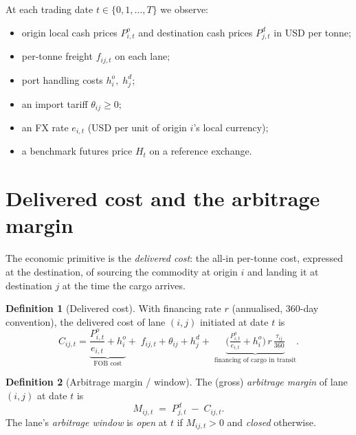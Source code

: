 \documentclass[11pt]{article}
\theoremstyle{definition}
\newtheorem{definition}{Definition}
\theoremstyle{plain}
\begin{document}
At each trading date $t\in\{0,1,\dots,T\}$ we observe:
\begin{itemize}[topsep=2pt,itemsep=1pt]
  \item origin local cash prices $P^{o}_{i,t}$ and destination cash prices
        $P^{d}_{j,t}$ in USD per tonne;
  \item per-tonne freight $f_{ij,t}$ on each lane;
  \item port handling costs $h_i^o,\;h_j^d$;
  \item an import tariff $\theta_{ij}\ge 0$;
  \item an FX rate $e_{i,t}$ (USD per unit of origin $i$'s local currency);
  \item a benchmark futures price $H_t$ on a reference exchange.
\end{itemize}

\section{Delivered cost and the arbitrage margin}
\label{sec:delivered}

The economic primitive is the \emph{delivered cost}: the all-in per-tonne cost,
expressed at the destination, of sourcing the commodity at origin $i$ and
landing it at destination $j$ at the time the cargo arrives.

\begin{definition}[Delivered cost]
\label{def:delivered}
With financing rate $r$ (annualised, $360$-day convention), the delivered cost
of lane $(i,j)$ initiated at date $t$ is
\begin{equation}
C_{ij,t}
=\underbrace{\frac{P^{o}_{i,t}}{e_{i,t}}+h^o_i}_{\text{FOB cost}}
+\;f_{ij,t}+\theta_{ij}+h^d_j
+\;\underbrace{\Big(\tfrac{P^o_{i,t}}{e_{i,t}}+h^o_i\Big)\, r\,\tfrac{\tau_{ij}}{360}}_{\text{financing of cargo in transit}}.
\label{eq:delivered}
\end{equation}
\end{definition}

\begin{definition}[Arbitrage margin / window]
The (gross) \emph{arbitrage margin} of lane $(i,j)$ at date $t$ is
\begin{equation}
M_{ij,t}\;=\;P^{d}_{j,t}\;-\;C_{ij,t}.
\label{eq:margin}
\end{equation}
The lane's \emph{arbitrage window} is \emph{open} at $t$ if $M_{ij,t}>0$ and
\emph{closed} otherwise.
\end{definition}
\end{document}
